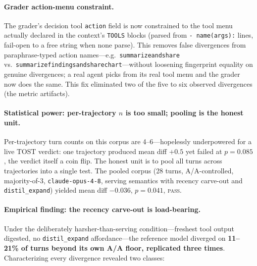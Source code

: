 \documentclass[11pt]{article}
\begin{document}
\paragraph{Grader action-menu constraint.}
The grader's decision tool \texttt{action} field is now constrained to the tool menu actually
declared in the context's \texttt{TOOLS} blocks (parsed from \texttt{-~name(args):} lines,
fail-open to a free string when none parse). This removes false divergences from
paraphrase-typed action names---e.g.\ \texttt{summarizeandshare}
vs.\ \texttt{summarizefindingsandsharechart}---without loosening fingerprint equality on
genuine divergences; a real agent picks from its real tool menu and the grader now does the
same. This fix eliminated two of the five to six observed divergences (the metric artifacts).

\paragraph{Statistical power: per-trajectory $n$ is too small; pooling is the honest unit.}
Per-trajectory turn counts on this corpus are 4--6---hopelessly underpowered for a live TOST
verdict: one trajectory produced mean diff $+0.5$ yet failed at $p=0.085$, the verdict itself
a coin flip. The honest unit is to pool all turns across trajectories into a single test. The
pooled corpus (28 turns, A/A-controlled, majority-of-3, \texttt{claude-opus-4-8}, serving
semantics with recency carve-out and \texttt{distil\_expand}) yielded mean diff $-0.036$,
$p=0.041$, \textsc{pass}.

\paragraph{Empirical finding: the recency carve-out is load-bearing.}
Under the deliberately harsher-than-serving condition---freshest tool output digested, no
\texttt{distil\_expand} affordance---the reference model diverged on \textbf{11--21\% of
turns beyond its own A/A floor, replicated three times}. Characterizing every divergence
revealed two classes:
\end{document}

